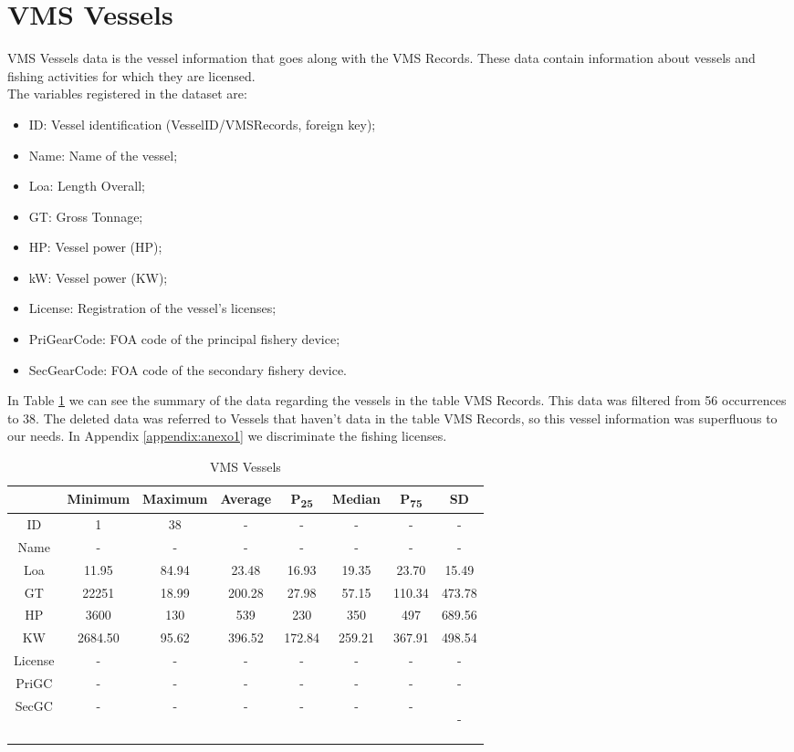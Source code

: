 \section{VMS Vessels} %
\label{sub:vms_vessels}
VMS Vessels data is the vessel information that goes along with the VMS Records. These data contain information about vessels and fishing activities for which they are licensed.  \\
The variables registered in the dataset are:
\begin{itemize}
\item    ID: Vessel identification (VesselID/VMSRecords, foreign key);
\item    Name: Name of the vessel;
\item    Loa: Length Overall; 
\item    GT: Gross Tonnage;
\item    HP: Vessel power (HP);
\item    kW: Vessel power (KW);
\item    License: Registration of the vessel's licenses;
\item    PriGearCode: FOA code of the principal fishery device;
\item    SecGearCode: FOA code of the secondary fishery device.
\end{itemize}

In Table \ref{table:vms_vessels} we can see the summary of the data regarding the vessels in the table VMS Records. This data was filtered from 56 occurrences to 38. The deleted data was referred to Vessels that haven’t data in the table VMS Records, so this vessel information was superfluous to our needs. In Appendix \ref{appendix:anexo1} we discriminate the fishing licenses. 


\begin {table}[H]
\small
\begin{center}
\begin{tabular}{c|c|c|c|c|c|c|c}
            &  Minimum & Maximum & Average & P\textsubscript{25} & Median & P\textsubscript{75} & SD \\
\hline
ID     & 1&38&-&-&-&-&-\\
Name         &-&-&-&-&-&-&-\\
Loa         & 11.95&84.94&23.48&16.93&19.35&23.70&15.49\\
GT        &22251&18.99&200.28&27.98&57.15&110.34&473.78\\
HP        & 3600&130&539&230&350&497&689.56\\
KW        &2684.50&95.62&396.52&172.84&259.21&367.91&498.54\\
License        &-&-&-&-&-&-&-\\
PriGC       &-&-&-&-&-&-&-\\
SecGC        &-&-&-&-&-&-&-


           
\label{table:vms_vessels}
\end{tabular}
\caption {VMS Vessels}
\end{center}
\end {table}

